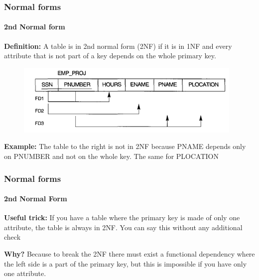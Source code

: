 \documentclass{beamer}
\begin{document}
\begin{frame}
	\frametitle{Normal forms}
	\framesubtitle{2nd Normal form}
	
	\textbf{Definition:}
	A table is in 2nd normal form (2NF) if it is in 1NF and every attribute that is not part of a key depends on the whole primary key.
\pause	
	\begin{figure}
		\begin{center}
			\includegraphics[scale=0.5]{img/normalization/norm8}
		\end{center}
	\end{figure}
	
\pause
	\textbf{Example:}
	The table to the right is not in 2NF because PNAME depends only on PNUMBER and not on the whole key. The same for PLOCATION
	
\end{frame}

\begin{frame}
	\frametitle{Normal forms}
	\framesubtitle{2nd Normal Form}
	
	\textbf{Useful trick:}
	If you have a table where the primary key is made of only one attribute, the table is always in 2NF. You can say this without any additional check
	
	\textbf{Why?}
	\pause
	Because to break the 2NF there must exist a functional dependency where the left side is a part of the primary key, but this is impossible if you have only one attribute.
\end{frame}
\end{document}
